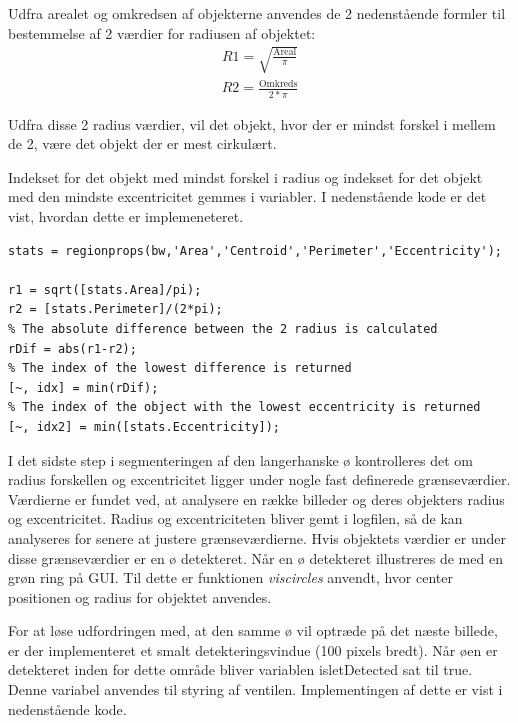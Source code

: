 Udfra arealet og omkredsen af objekterne anvendes de 2 nedenstående formler til bestemmelse af 2 værdier for radiusen af objektet:
\begin{align}
R1 = \sqrt{\frac{\text{Areal}}{\pi}}
\end{align}
\begin{align}
R2 = \frac{\text{Omkreds}}{2*\pi}
\end{align}

Udfra disse 2 radius værdier, vil det objekt, hvor der er mindst forskel i mellem de 2, være det objekt der er mest cirkulært. 

Indekset for det objekt med mindst forskel i radius og indekset for det objekt med den mindste excentricitet gemmes i variabler. I nedenstående kode er det vist, hvordan dette er implemeneteret.

\begin{lstlisting} 
stats = regionprops(bw,'Area','Centroid','Perimeter','Eccentricity');

r1 = sqrt([stats.Area]/pi);
r2 = [stats.Perimeter]/(2*pi);
% The absolute difference between the 2 radius is calculated
rDif = abs(r1-r2);
% The index of the lowest difference is returned
[~, idx] = min(rDif);
% The index of the object with the lowest eccentricity is returned 
[~, idx2] = min([stats.Eccentricity]);
\end{lstlisting} 

I det sidste step i segmenteringen af den langerhanske ø kontrolleres det om radius forskellen og excentricitet ligger under nogle fast definerede grænseværdier. Værdierne er fundet ved, at analysere en række billeder og deres objekters radius og excentricitet. Radius og excentriciteten bliver gemt i logfilen, så de kan analyseres for senere at justere grænseværdierne. Hvis objektets værdier er under disse grænseværdier er en ø detekteret. Når en ø detekteret illustreres de med en grøn ring på GUI. Til dette er funktionen \textit{viscircles} anvendt, hvor center positionen og radius for objektet anvendes. 

For at løse udfordringen med, at den samme ø vil optræde på det næste billede, er der implementeret et smalt detekteringsvindue (100 pixels bredt). Når øen er detekteret inden for dette område bliver variablen isletDetected sat til true. Denne variabel anvendes til styring af ventilen. Implementingen af dette er vist i nedenstående kode.


